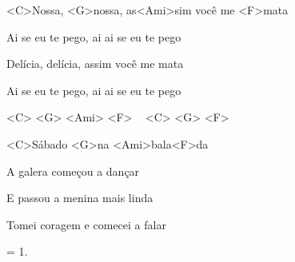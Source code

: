 
\zr

<C>Nossa, <G>nossa,
as<Ami>sim você me <F>mata

Ai se eu te pego,
ai ai se eu te pego

Delícia, delícia,
assim você me mata

Ai se eu te pego,
ai ai se eu te pego
\kr


<C> <G> <Ami> <F> ~ <C> <G> <F>

\zs
<C>Sábado <G>na <Ami>bala<F>da

A galera começou a dançar

E passou a menina mais linda

Tomei coragem e comecei a falar
\ks

\zr \kr

\zs
= 1.
\ks

\zr \kr

\zr \kr

\kp
